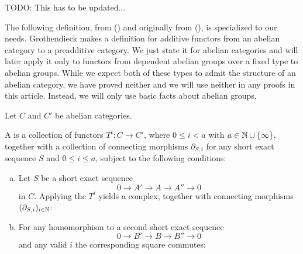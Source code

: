 TODO: This has to be updated...

The following definition, from (\cite[2.1]{tohoku-translation}) and originally from (\cite{tohoku1957}), is specialized to our needs.
Grothendieck makes a definition for additive functors from an abelian category to a preadditive category.
We just state it for abelian categories and will later apply it only to functors from dependent abelian groups over a fixed type to abelian groups.
While we expect both of these types to admit the structure of an abelian category, we have proved neither and we will use neither in any proofs in this article.
Instead, we will only use basic facts about abelian groups.

\begin{definition}
  Let $C$ and $C'$ be abelian categories.
  
  A  is a collection of functors $T^i:C\to C'$, where $0\leq i < a$ with $a\in\mathbb{N}\cup\{\infty\}$,
  together with a collection of connecting morphisms $\partial_{S,i}$ for any short exact sequence $S$ and $0\leq i\le a$, subject to the following conditions:
  \begin{enumerate}[(a)]
  \item Let $S$ be a short exact sequence
    \[ 0\to A'\to A\to A''\to 0\]
    in $C$. Applying the $T^i$ yields a complex, together with connecting morphisms $(\partial_{S,i})_{i\in\mathbb{N}}$:
    \begin{center}
    \end{center}
  \item For any homomorphism to a second short exact sequence
    \[ 0\to B'\to B\to B''\to 0\]
    and any valid $i$ the corresponding square commutes:
    \begin{center}
    \end{center}
  \end{enumerate}
\end{definition}

